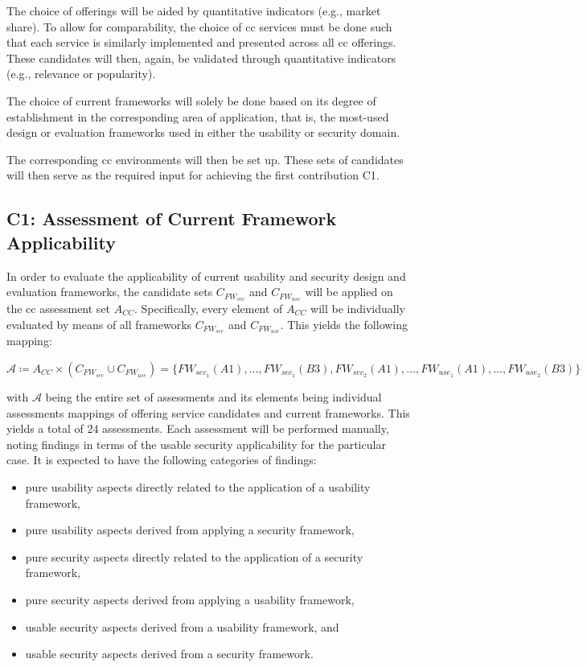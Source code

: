 The choice of offerings will be aided by quantitative indicators (e.g., market share). To allow for comparability, the choice of \ac{cc} services must be done such that each service is similarly implemented and presented across all \ac{cc} offerings. These candidates will then, again, be validated through quantitative indicators (e.g., relevance or popularity).

The choice of current frameworks will solely be done based on its degree of establishment in the corresponding area of application, that is, the most-used design or evaluation frameworks used in either the usability or security domain.

The corresponding \ac{cc} environments will then be set up. These sets of candidates will then serve as the required input for achieving the first contribution C1.

\subsection{C1: Assessment of Current Framework Applicability} \label{subs:approach-structure-assess}
In order to evaluate the applicability of current usability and security design and evaluation frameworks, the candidate sets $C_{FW_{sec}}$ and $C_{FW_{use}}$ will be applied on the \ac{cc} assessment set $A_{CC}$. Specifically, every element of $A_{CC}$ will be individually evaluated by means of all frameworks $C_{FW_{sec}}$ and $C_{FW_{use}}$. This yields the following mapping:

\begin{center}
	$\mathcal{A} \coloneqq A_{CC} \times (C_{FW_{sec}} \cup C_{FW_{use}}) = \{FW_{sec_1}(A1), \dots, FW_{sec_1}(B3), FW_{sec_2}(A1), \dots, FW_{use_1}(A1), \dots, FW_{use_2}(B3)\}$
\end{center}

with $\mathcal{A}$ being the entire set of assessments and its elements being individual assessments mappings of offering service candidates and current frameworks. This yields a total of 24 assessments. Each assessment will be performed manually, noting findings in terms of the usable security applicability for the particular case. It is expected to have the following categories of findings:

\begin{itemize}
	\item pure usability aspects directly related to the application of a usability framework,
	\item pure usability aspects derived from applying a security framework,
	\item pure security aspects directly related to the application of a security framework,
	\item pure security aspects derived from applying a usability framework,
	\item usable security aspects derived from a usability framework, and
	\item usable security aspects derived from a security framework.
\end{itemize}

